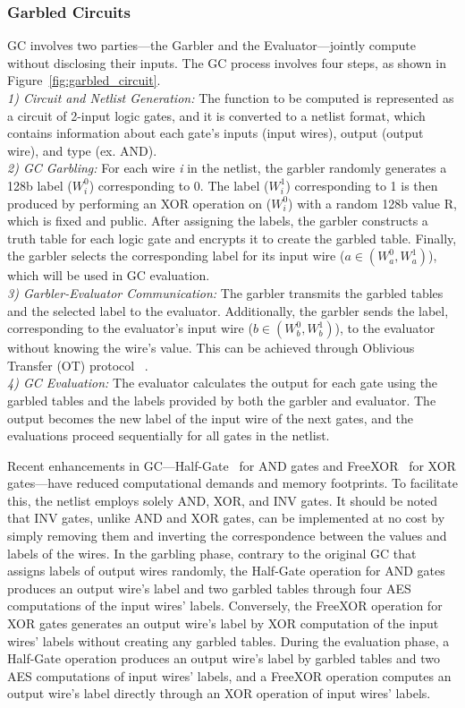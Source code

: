 \subsubsection{\textbf{Garbled Circuits}}
GC involves two parties---the Garbler and the Evaluator---jointly compute without disclosing their inputs. The GC process involves four steps, as shown in Figure~\ref{fig:garbled_circuit}.\\
\textit{1) Circuit and Netlist Generation: } 
The function to be computed is represented as a circuit of 2-input logic gates, and it is converted to a netlist format, which contains information about each gate's inputs (input wires), output (output wire), and type (ex. AND).\\
\textit{2) GC Garbling: } 
For each wire \textit{i} in the netlist, the garbler randomly generates a 128b label ($W_i^0$) corresponding to 0. The label ($W_i^1$) corresponding to 1 is then produced by performing an XOR operation on ($W_i^0$) with a random 128b value R, which is fixed and public. After assigning the labels, the garbler constructs a truth table for each logic gate and encrypts it to create the garbled table. Finally, the garbler selects the corresponding label for its input wire ($a \in (W_a^0, W_a^1)$), which will be used in GC evaluation.\\
\textit{3) Garbler-Evaluator Communication:}
The garbler transmits the garbled tables and the selected label to the evaluator. Additionally, the garbler sends the label, corresponding to the evaluator's input wire ($b \in (W_b^0, W_b^1)$), to the evaluator without knowing the wire's value. This can be achieved through Oblivious Transfer (OT) protocol ~\cite{ishai2003extending}.\\
\textit{4) GC Evaluation:}
The evaluator calculates the output for each gate using the garbled tables and the labels provided by both the garbler and evaluator. The output becomes the new label of the input wire of the next gates, and the evaluations proceed sequentially for all gates in the netlist.

Recent enhancements in GC---Half-Gate~\cite{zahur2015two} for AND gates and FreeXOR~\cite{kolesnikov2008improved} for XOR gates---have reduced computational demands and memory footprints. To facilitate this, the netlist employs solely AND, XOR, and INV gates. It should be noted that INV gates, unlike AND and XOR gates, can be implemented at no cost by simply removing them and inverting the correspondence between the values and labels of the wires. In the garbling phase, contrary to the original GC that assigns labels of output wires randomly, the Half-Gate operation for AND gates produces an output wire's label and two garbled tables through four AES computations of the input wires' labels. Conversely, the FreeXOR operation for XOR gates generates an output wire's label by XOR computation of the input wires' labels without creating any garbled tables.
During the evaluation phase, a Half-Gate operation produces an output wire's label by garbled tables and two AES computations of input wires' labels, and a FreeXOR operation computes an output wire's label directly through an XOR operation of input wires' labels.




